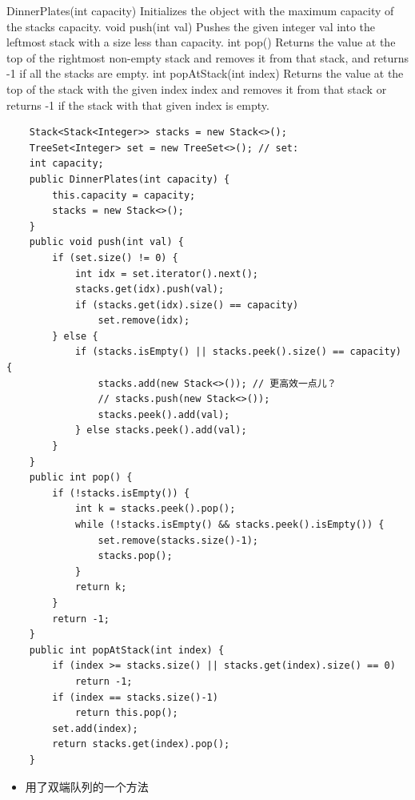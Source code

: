 \documentclass[9pt, b5paaper]{book}
\begin{document}
DinnerPlates(int capacity) Initializes the object with the maximum capacity of the stacks capacity.
void push(int val) Pushes the given integer val into the leftmost stack with a size less than capacity.
int pop() Returns the value at the top of the rightmost non-empty stack and removes it from that stack, and returns -1 if all the stacks are empty.
int popAtStack(int index) Returns the value at the top of the stack with the given index index and removes it from that stack or returns -1 if the stack with that given index is empty.
\begin{verbatim}
    Stack<Stack<Integer>> stacks = new Stack<>();
    TreeSet<Integer> set = new TreeSet<>(); // set: 
    int capacity;
    public DinnerPlates(int capacity) {
        this.capacity = capacity;
        stacks = new Stack<>();
    }
    public void push(int val) {
        if (set.size() != 0) {
            int idx = set.iterator().next();
            stacks.get(idx).push(val);
            if (stacks.get(idx).size() == capacity)
                set.remove(idx);
        } else {
            if (stacks.isEmpty() || stacks.peek().size() == capacity) {
                stacks.add(new Stack<>()); // 更高效一点儿？
                // stacks.push(new Stack<>());
                stacks.peek().add(val);
            } else stacks.peek().add(val);
        }
    }
    public int pop() {
        if (!stacks.isEmpty()) {
            int k = stacks.peek().pop();
            while (!stacks.isEmpty() && stacks.peek().isEmpty()) {
                set.remove(stacks.size()-1);
                stacks.pop();
            }
            return k;
        }
        return -1;
    }
    public int popAtStack(int index) {
        if (index >= stacks.size() || stacks.get(index).size() == 0) 
            return -1;
        if (index == stacks.size()-1)
            return this.pop();
        set.add(index);
        return stacks.get(index).pop();
    }
\end{verbatim}
\begin{itemize}
\item 用了双端队列的一个方法
\end{itemize}
\end{document}
